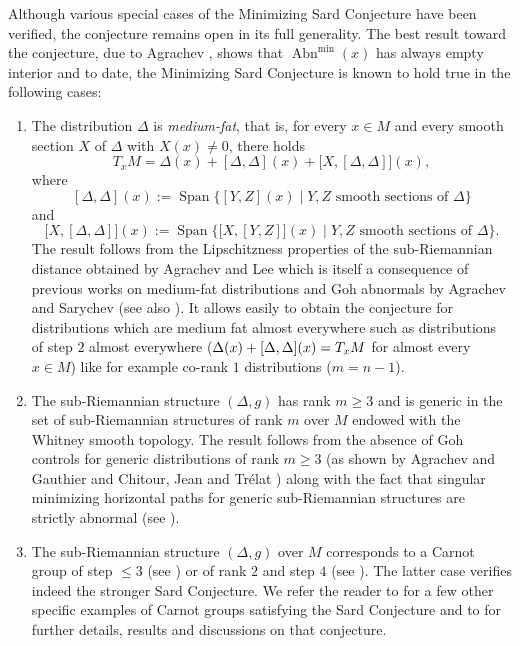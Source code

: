 \documentclass[JEP,XML,SOM,Unicode,NoFloatCountersInSection,published]{cedram}
\newenvironment{enumeratei}
{\bgroup\def\theenumi{\roman{enumi}}\def\theenumii{\arabic{enumii}}\begin{enumerate}}
{\end{enumerate}\egroup}
\let\sep\mid
\DeclareMathOperator{\Abn}{Abn}
\DeclareMathOperator{\Span}{Span}
\theoremstyle{definition}
\begin{document}
Although various special cases of the Minimizing Sard Conjecture have been verified, the conjecture remains open in its full generality. The best result toward the conjecture, due to Agrachev \cite{agrachev09}, shows that $\Abn^{\min}(x)$ has always empty interior and to date, the Minimizing Sard Conjecture is known to hold true in the following cases:

\begin{enumeratei}
\item
The distribution $\Delta$ is {\it medium-fat}, that is, for every $x\in M$ and every smooth section $X$ of $\Delta$ with $X(x) \neq 0$, there holds
\begin{equation*}
T_xM = \Delta(x)+ [\Delta,\Delta](x) + \bigl[X,[\Delta,\Delta] \bigr](x),
\end{equation*}
where
\[
[\Delta,\Delta] (x) := \Span \bigl\{ [Y,Z](x) \sep  Y, Z \text{ smooth sections of } \Delta \bigr\}
\]
and
\[
\bigl[X,[\Delta,\Delta] \bigr] (x) := \Span \bigl\{ \bigl[X,[Y,Z]\bigr] (x) \sep  Y, Z \text{ smooth sections of } \Delta \bigr\}.
\]
The result follows from the Lipschitzness properties of the sub-Riemannian distance obtained by Agrachev and Lee \cite{al09} which is itself a consequence of previous works on medium-fat distributions and Goh abnormals by Agrachev and Sarychev \cite{as99} (see also \cite{riffordbook}). It allows easily to obtain the conjecture for distributions which are medium fat almost everywhere such as distributions of step $2$ almost everywhere ($\Delta(x)+\nobreak[\Delta,\Delta](x)=T_xM$ for almost every $x\in M$) like for example co-rank $1$ distributions ($m=n-1$).
\item
The sub-Riemannian structure $(\Delta,g)$ has rank $m\geq 3$ and is generic in the set of sub-Riemannian structures of rank $m$ over $M$ endowed with the Whitney smooth topology. The result follows from the absence of Goh controls for generic distributions of rank $m\geq 3$ (as shown by Agrachev and Gauthier \cite[Th.\,8]{ag01} and Chitour, Jean and Trélat \cite[Cor.\,2.5]{cjt06}) along with the fact that singular minimizing horizontal paths for generic sub-Riemannian structures are strictly abnormal (see \cite{cjt06}).
\item
The sub-Riemannian structure $(\Delta,g)$ over $M$ corresponds to a Carnot group of step $\leq 3$ (see \cite{lmopv16}) or of rank $2$ and step $4$ (see \cite{bv20}). The latter case verifies indeed the stronger Sard Conjecture. We refer the reader to \cite{bnv22,lmopv16} for a few other specific examples of Carnot groups satisfying the Sard Conjecture and to \cite{agrachev14,br18,bfpr18,bpr22,bnv22,bv20,lmopv16,montgomery02,ov19,riffordbourbaki,rt05} for further details, results and discussions on that conjecture.
\end{enumeratei}
\end{document}
